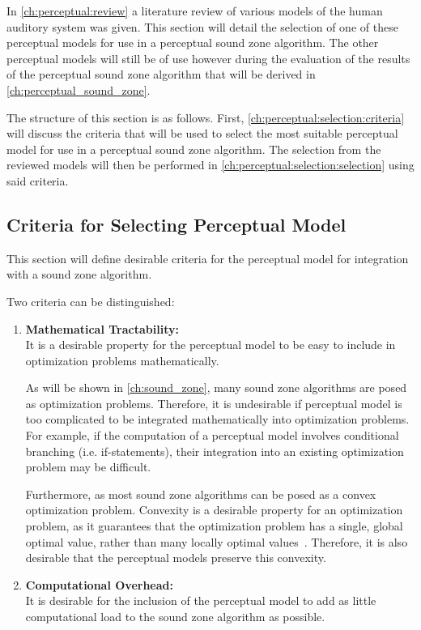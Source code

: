In \autoref{ch:perceptual:review} a literature review of various models of the human auditory system was given.
This section will detail the selection of one of these perceptual models for use in a perceptual sound zone algorithm.
The other perceptual models will still be of use however during the evaluation of the results of the perceptual
sound zone algorithm that will be derived in \autoref{ch:perceptual_sound_zone}.

The structure of this section is as follows.
First, \autoref{ch:perceptual:selection:criteria} will discuss the criteria that will be used to select the most suitable perceptual model for use in 
a perceptual sound zone algorithm.
The selection from the reviewed models will then be performed in \autoref{ch:perceptual:selection:selection} using said criteria.

\subsection{Criteria for Selecting Perceptual Model}
\label{ch:perceptual:selection:criteria}
This section will define desirable criteria for the perceptual model for integration with a sound zone algorithm.

Two criteria can be distinguished:
\begin{enumerate}
    \item \textbf{Mathematical Tractability:}\\
        It is a desirable property for the perceptual model to be easy to include in optimization problems mathematically.

        As will be shown in \autoref{ch:sound_zone}, many sound zone algorithms are posed as optimization problems.
        Therefore, it is undesirable if perceptual model is too complicated to be integrated mathematically into optimization problems.
        For example, if the computation of a perceptual model involves conditional branching (i.e. if-statements), their
        integration into an existing optimization problem may be difficult.

        Furthermore, as most sound zone algorithms can be posed as a convex optimization problem.
        Convexity is a desirable property for an optimization problem, as it guarantees that the optimization problem has a single, 
        global optimal value, rather than many locally optimal values~\cite{boyd2004convex}. 
        Therefore, it is also desirable that the perceptual models preserve this convexity.

    \item \textbf{Computational Overhead:}\\
        It is desirable for the inclusion of the perceptual model to add as little computational load to the sound zone algorithm as possible.
\end{enumerate}

